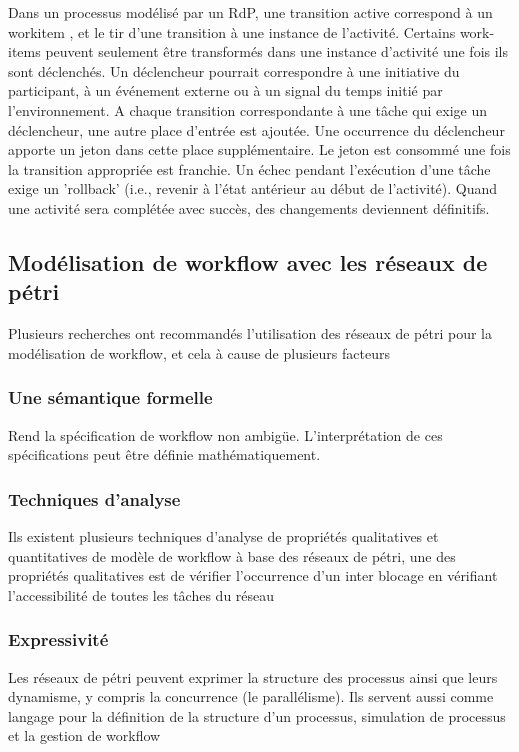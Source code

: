 Dans un processus modélisé par un RdP, une transition active correspond à  un workitem , et le tir d'une transition à une instance de l'activité. Certains work-items peuvent seulement être transformés dans une instance d'activité une fois ils sont déclenchés. Un déclencheur pourrait correspondre à une initiative du participant, à un événement externe ou à un signal du temps initié par l'environnement. A chaque transition correspondante à une tâche qui exige un déclencheur, une autre place d'entrée est ajoutée. Une occurrence du déclencheur apporte un jeton dans cette place supplémentaire. Le jeton est consommé une fois la transition appropriée est franchie. Un échec pendant l'exécution d'une tâche exige un 'rollback' (i.e., revenir à l'état antérieur au début de l'activité). Quand une activité sera complétée avec succès, des changements deviennent définitifs.

\subsection{Modélisation de workflow avec les réseaux de pétri }


Plusieurs recherches ont recommandés l'utilisation des réseaux de pétri pour la modélisation de workflow, et cela à cause de plusieurs facteurs

\subsubsection{Une sémantique formelle } 

Rend la spécification de workflow non ambigüe. L’interprétation de ces spécifications peut être définie mathématiquement.

\subsubsection{Techniques d’analyse} 

Ils existent plusieurs techniques d’analyse de propriétés qualitatives et quantitatives de modèle de workflow à base des réseaux de pétri, une des propriétés qualitatives est de vérifier l’occurrence d’un inter blocage en vérifiant l’accessibilité de toutes les tâches du réseau 

\subsubsection{Expressivité}
Les réseaux de pétri peuvent exprimer la structure des processus ainsi que leurs dynamisme, y compris la concurrence (le parallélisme). Ils servent aussi comme langage pour la définition de la structure d’un processus, simulation de processus et la gestion de workflow


